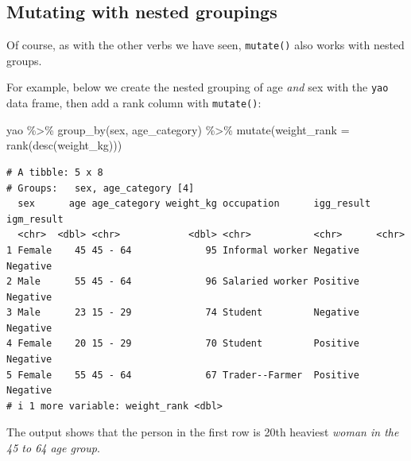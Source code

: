 \documentclass[
  letterpaper,
  DIV=11,
  numbers=noendperiod]{scrreprt}
\newenvironment{Shaded}{\begin{snugshade}}{\end{snugshade}}
\newcommand{\AttributeTok}[1]{\textcolor[rgb]{0.40,0.45,0.13}{#1}}
\newcommand{\FunctionTok}[1]{\textcolor[rgb]{0.28,0.35,0.67}{#1}}
\newcommand{\NormalTok}[1]{\textcolor[rgb]{0.00,0.23,0.31}{#1}}
\newcommand{\SpecialCharTok}[1]{\textcolor[rgb]{0.37,0.37,0.37}{#1}}
\begin{document}
\hypertarget{mutating-with-nested-groupings}{%
\subsection*{Mutating with nested
groupings}\label{mutating-with-nested-groupings}}

Of course, as with the other verbs we have seen, \texttt{mutate()} also
works with nested groups.

For example, below we create the nested grouping of age \emph{and} sex
with the \texttt{yao} data frame, then add a rank column with
\texttt{mutate()}:

\begin{Shaded}
\begin{Highlighting}[]
\NormalTok{yao }\SpecialCharTok{\%\textgreater{}\%} 
  \FunctionTok{group\_by}\NormalTok{(sex, age\_category) }\SpecialCharTok{\%\textgreater{}\%} 
  \FunctionTok{mutate}\NormalTok{(}\AttributeTok{weight\_rank =} \FunctionTok{rank}\NormalTok{(}\FunctionTok{desc}\NormalTok{(weight\_kg)))}
\end{Highlighting}
\end{Shaded}

\begin{verbatim}
# A tibble: 5 x 8
# Groups:   sex, age_category [4]
  sex      age age_category weight_kg occupation      igg_result igm_result
  <chr>  <dbl> <chr>            <dbl> <chr>           <chr>      <chr>     
1 Female    45 45 - 64             95 Informal worker Negative   Negative  
2 Male      55 45 - 64             96 Salaried worker Positive   Negative  
3 Male      23 15 - 29             74 Student         Negative   Negative  
4 Female    20 15 - 29             70 Student         Positive   Negative  
5 Female    55 45 - 64             67 Trader--Farmer  Positive   Negative  
# i 1 more variable: weight_rank <dbl>
\end{verbatim}

The output shows that the person in the first row is 20th heaviest
\emph{woman in the 45 to 64 age group}.
\end{document}
